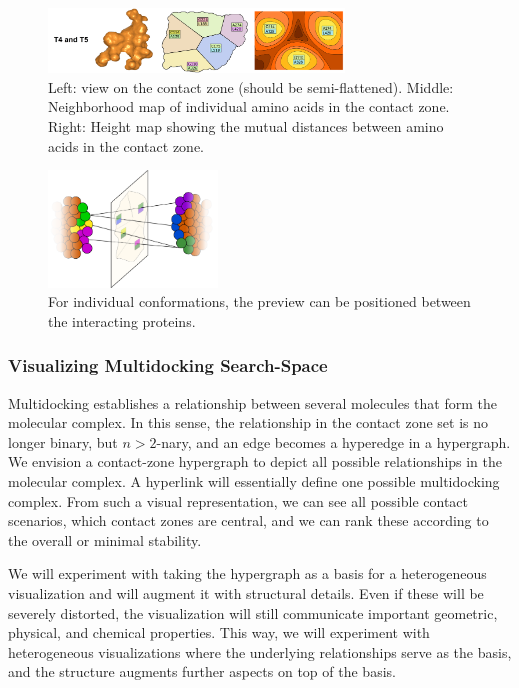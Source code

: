\documentclass[11pt,a4paper,titlepage,oneside,onecolumn]{article}
\begin{document}
\begin{figure}[ht]
\centering
\includegraphics[width=0.7\textwidth]{pics/preview.png}
\caption{Left: view on the contact zone (should be semi-flattened). Middle: Neighborhood map of individual amino acids in the contact zone. Right: Height map showing the mutual distances between amino acids in the contact zone.}
\label{fig:preview}
\end{figure}

\begin{figure}[ht]
\centering
\includegraphics[width=0.4\textwidth]{pics/map.png}
\caption{For individual conformations, the preview can be positioned between the interacting proteins.}
\label{fig:map}
\end{figure}

\subsubsection{Visualizing Multidocking Search-Space}
Multidocking establishes a relationship between several molecules that form the molecular complex. 
In this sense, the relationship in the contact zone set is no longer binary, but $n>2$-nary, and an edge becomes a hyperedge in a hypergraph. 
We envision a contact-zone hypergraph to depict all possible relationships in the molecular complex. 
A hyperlink will essentially define one possible multidocking complex. 
From such a visual representation, we can see all possible contact scenarios, which contact zones are central, and we can rank these according to the overall or minimal stability.

We will experiment with taking the hypergraph as a basis for a heterogeneous visualization and will augment it with structural details.
Even if these will be severely distorted, the visualization will still communicate important geometric, physical, and chemical properties. 
This way, we will experiment with heterogeneous visualizations where the underlying relationships serve as the basis, and the structure augments further aspects on top of the basis.
\end{document}
